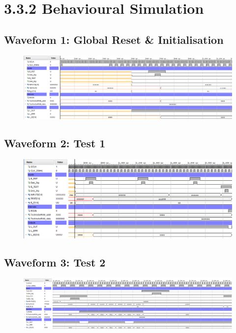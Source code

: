 \documentclass[11pt]{report}
\begin{document}
\section*{3.3.2 Behavioural Simulation}
\subsection*{Waveform 1: Global Reset \& Initialisation}
\begin{figure}[H]
    \includegraphics[width=\columnwidth]{Assets/3.3.2_reset.png}
\end{figure}

\subsection*{Waveform 2: Test 1}
\begin{figure}[H]
    \includegraphics[width=\columnwidth]{Assets/3.3.2_test1.png}
\end{figure}

\subsection*{Waveform 3: Test 2}
\begin{figure}[H]
    \includegraphics[width=\columnwidth]{Assets/3.3.2_test2.png}
\end{figure}
\end{document}
